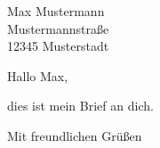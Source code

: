 \documentclass[%
foldmarks=P,%
version=last,%
fromalign=right,%
fromphone,%
fromemail%
]{scrlttr2}
\begin{document}

\begin{letter}{%
Max Mustermann\\
Mustermannstraße\\
12345 Musterstadt
}
\opening{Hallo Max,}

dies ist mein Brief an dich.

\closing{
Mit freundlichen Grüßen
}




\end{letter}
\end{document}

